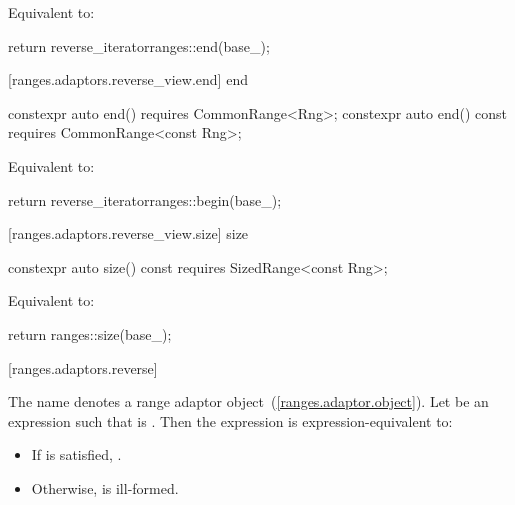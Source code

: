 \begin{itemdescr}
\pnum
\effects Equivalent to:
\begin{codeblock}
return reverse_iterator{ranges::end(base_)};
\end{codeblock}
\end{itemdescr}

[ranges.adaptors.reverse_view.end]{ end}

%
\begin{itemdecl}
constexpr auto end() requires CommonRange<Rng>;
constexpr auto end() const requires CommonRange<const Rng>;
\end{itemdecl}

\begin{itemdescr}
\pnum
\effects Equivalent to:
\begin{codeblock}
return reverse_iterator{ranges::begin(base_)};
\end{codeblock}
\end{itemdescr}

[ranges.adaptors.reverse_view.size]{ size}

%
\begin{itemdecl}
constexpr auto size() const requires SizedRange<const Rng>;
\end{itemdecl}

\begin{itemdescr}
\pnum
\effects Equivalent to:
\begin{codeblock}
return ranges::size(base_);
\end{codeblock}
\end{itemdescr}

[ranges.adaptors.reverse]{}

\pnum
The name  denotes a range adaptor
object~(\ref{ranges.adaptor.object}).
Let  be an expression such that  is .
Then the expression  is expression-equivalent to:

\begin{itemize}
\item If  is satisfied,
.
\item Otherwise,  is ill-formed.
\end{itemize}
